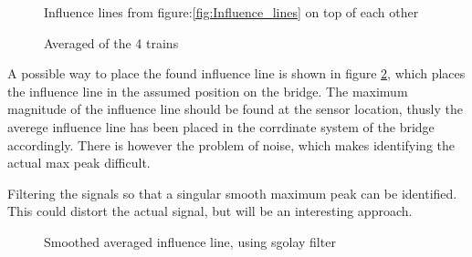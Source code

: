 \begin{figure}[H]
\centering

\caption{Influence lines from figure:\ref{fig:Influence_lines} on top of each other}
\label{fig:infl_all_trains}
\end{figure}

\begin{figure}[H]
\centering

\caption{Averaged of the 4 trains}
\label{fig:infl_vec_averaged}
\end{figure}
A possible way to place the found influence line is shown in figure \ref{fig:infl_vec_averaged}, which places the influence line in the assumed position on the bridge. The maximum magnitude of the influence line should be found at the sensor location, thusly the averege influence line has been placed in the corrdinate system of the bridge accordingly. There is however the problem of noise, which makes identifying the actual max peak difficult.

Filtering the signals so that a singular smooth maximum peak can be identified. This could distort the actual signal, but will be an interesting approach.

% 

\begin{figure}[H]
\centering

\caption{Smoothed averaged influence line, using sgolay filter}
\label{fig:infl_averaged_smoothed}
\end{figure}
